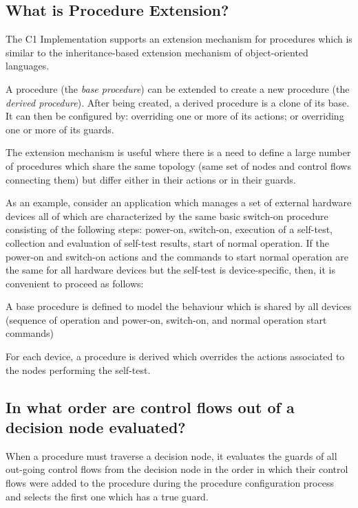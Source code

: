 \documentclass[faq]{../fwprofile}
\begin{document}
\subsection{What is Procedure Extension?}\label{faq:PR_Extension}
The C1 Implementation supports an extension mechanism for procedures which is similar to the inheritance-based extension mechanism of object-oriented languages.

A procedure (the \emph{base procedure}) can be extended to create a new procedure (the \emph{derived procedure}). After being created, a derived procedure is 
a clone of its base. It can then be configured by: overriding one or more of its actions; or overriding one or more of its guards.

The extension mechanism is useful where there is a need to define a large number of procedures which share the same topology (same set of nodes and 
control flows connecting them) but differ either in their actions or in their guards.

As an example, consider an application which manages a set of external hardware devices all of which are characterized by the same basic switch-on 
procedure consisting of the following steps: power-on, switch-on, execution of a self-test, collection and evaluation of self-test results, 
start of normal operation. If the power-on and switch-on actions and the commands to start normal operation are the same for all hardware devices 
but the self-test is device-specific, then, it is convenient to proceed as follows:

\begin{fw_itemize} 
\item A base procedure is defined to model the behaviour which is shared by all devices (sequence of operation and power-on, switch-on, and normal operation start commands) 
\item For each device, a procedure is derived which overrides the actions associated to the nodes performing the self-test.
\end{fw_itemize}

\subsection{In what order are control flows out of a decision node evaluated?}
When a procedure must traverse a decision node, it evaluates the guards of all out-going control flows from the decision node in the order in which
their control flows were added to the procedure during the procedure configuration process and selects the first one which has a true guard.
\end{document}
